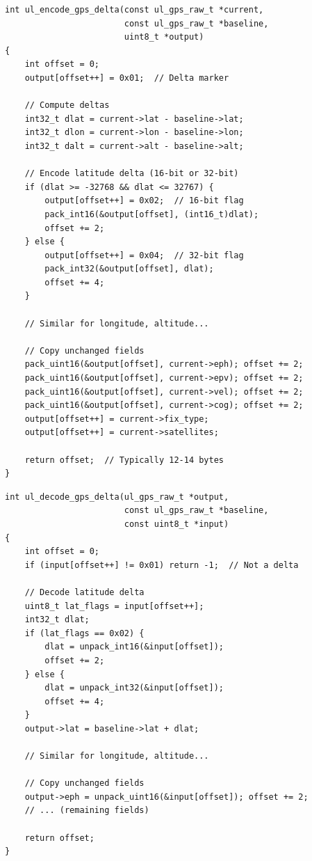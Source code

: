 \documentclass[11pt,a4paper]{article}
\begin{document}
\begin{lstlisting}[caption={Delta GPS Encoding}]
int ul_encode_gps_delta(const ul_gps_raw_t *current,
                        const ul_gps_raw_t *baseline,
                        uint8_t *output)
{
    int offset = 0;
    output[offset++] = 0x01;  // Delta marker

    // Compute deltas
    int32_t dlat = current->lat - baseline->lat;
    int32_t dlon = current->lon - baseline->lon;
    int32_t dalt = current->alt - baseline->alt;

    // Encode latitude delta (16-bit or 32-bit)
    if (dlat >= -32768 && dlat <= 32767) {
        output[offset++] = 0x02;  // 16-bit flag
        pack_int16(&output[offset], (int16_t)dlat);
        offset += 2;
    } else {
        output[offset++] = 0x04;  // 32-bit flag
        pack_int32(&output[offset], dlat);
        offset += 4;
    }

    // Similar for longitude, altitude...
    
    // Copy unchanged fields
    pack_uint16(&output[offset], current->eph); offset += 2;
    pack_uint16(&output[offset], current->epv); offset += 2;
    pack_uint16(&output[offset], current->vel); offset += 2;
    pack_uint16(&output[offset], current->cog); offset += 2;
    output[offset++] = current->fix_type;
    output[offset++] = current->satellites;

    return offset;  // Typically 12-14 bytes
}
\end{lstlisting}

\begin{lstlisting}[caption={Delta GPS Decoding}]
int ul_decode_gps_delta(ul_gps_raw_t *output,
                        const ul_gps_raw_t *baseline,
                        const uint8_t *input)
{
    int offset = 0;
    if (input[offset++] != 0x01) return -1;  // Not a delta

    // Decode latitude delta
    uint8_t lat_flags = input[offset++];
    int32_t dlat;
    if (lat_flags == 0x02) {
        dlat = unpack_int16(&input[offset]);
        offset += 2;
    } else {
        dlat = unpack_int32(&input[offset]);
        offset += 4;
    }
    output->lat = baseline->lat + dlat;

    // Similar for longitude, altitude...
    
    // Copy unchanged fields
    output->eph = unpack_uint16(&input[offset]); offset += 2;
    // ... (remaining fields)

    return offset;
}
\end{lstlisting}
\end{document}
